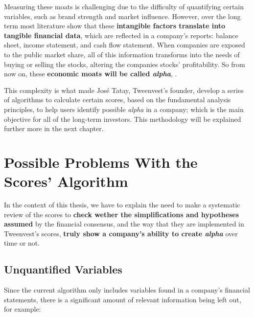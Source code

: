 \documentclass[11pt,english,a4paper,hidelinks]{book}
\begin{document}
\vspace{0.5cm}
\noindent Measuring these moats is challenging due to the difficulty of quantifying certain variables, such as brand strength and market influence. However, over the long term most literature show that these \textbf{intangible factors translate into tangible financial data}, which are reflected in a company's reports: balance sheet, income statement, and cash flow statement. When companies are exposed to the public market share, all of this information transforms into the needs of buying or selling the stocks, altering the companies stocks' profitability. So from now on, these \textbf{economic moats will be called \textit{alpha}}, \textcite{sharpe1964capm}.

\vspace{0.5cm}
\noindent This complexity is what made José Tatay, Tweenvest's founder, develop a series of algorithms to calculate certain scores, based on the fundamental analysis principles, to help users identify possible \textit{alpha} in a company; which is the main objective for all of the long-term investors. This methodology will be explained further more in the next chapter.

\section{Possible Problems With the Scores' Algorithm}

\noindent In the context of this thesis, we have to explain the need to make a systematic review of the scores to \textbf{check wether the simplifications and hypotheses assumed} by the financial consensus, and the way that they are implemented in Tweenvest's scores, \textbf{truly show a company's ability to create \textit{alpha}} over time or not.


\subsection{Unquantified Variables}
\noindent Since the current algorithm only includes variables found in a company's financial statements, there is a significant amount of relevant information being left out, for example:
\end{document}
